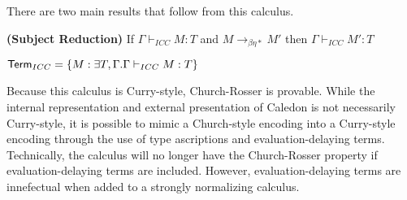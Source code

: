 There are two main results that follow from this calculus.

\begin{theorem}
\textbf{(Subject Reduction)} If $\Gamma \vdash_{ICC} M : T$ and $M \rightarrow_{\beta\eta*} M'$ then $\Gamma \vdash_{ICC} M' : T$
\end{theorem}

\begin{definition}
$ \mathsf{Term}_{ICC}  = \{ M : \exists T,\Gamma . \Gamma \vdash_{ICC} M : T \}$
\end{definition}

Because this calculus is Curry-style, Church-Rosser is provable.  
While the internal representation and external presentation of Caledon is not necessarily Curry-style, 
it is possible to mimic a Church-style encoding into a Curry-style encoding through the use of type ascriptions
and evaluation-delaying terms.  Technically, the calculus will no longer have the Church-Rosser property if 
evaluation-delaying terms are included. However, evaluation-delaying terms are innefectual when added to a strongly normalizing calculus.

